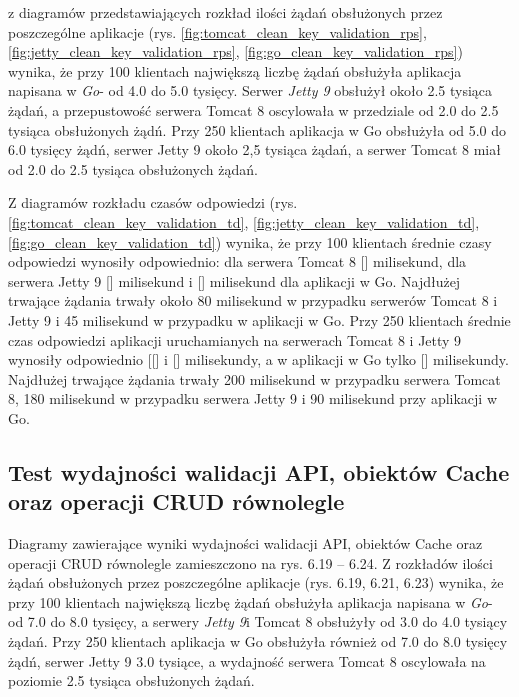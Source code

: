  z diagramów przedstawiających rozkład ilości żądań obsłużonych przez poszczególne aplikacje  (rys. \ref{fig:tomcat_clean_key_validation_rps}, \ref{fig:jetty_clean_key_validation_rps}, \ref{fig:go_clean_key_validation_rps}) wynika, że przy 100 klientach największą liczbę żądań  obsłużyła aplikacja napisana w \textsl{Go}- od 4.0 do 5.0 tysięcy. Serwer \textsl{Jetty 9} obsłużył około 2.5 tysiąca żądań, a przepustowość serwera Tomcat 8 oscylowała w przedziale od 2.0 do 2.5 tysiąca obsłużonych żądń. Przy 250 klientach aplikacja w Go obsłużyła od 5.0 do 6.0 tysięcy żądń, serwer Jetty 9 około 2,5 tysiąca żądań, a serwer Tomcat 8 miał od 2.0 do 2.5 tysiąca obsłużonych żądań. 
 
Z diagramów rozkładu czasów odpowiedzi (rys. \ref{fig:tomcat_clean_key_validation_td}, \ref{fig:jetty_clean_key_validation_td}, \ref{fig:go_clean_key_validation_td}) wynika, że przy 100 klientach średnie czasy odpowiedzi wynosiły odpowiednio: dla serwera Tomcat 8 [] milisekund, dla serwera Jetty 9 [] milisekund i [] milisekund dla aplikacji w Go.  Najdłużej trwające żądania trwały około 80 milisekund w przypadku serwerów Tomcat 8 i Jetty 9 i 45 milisekund w przypadku w aplikacji w Go. Przy 250 klientach średnie czas odpowiedzi aplikacji uruchamianych na serwerach Tomcat 8 i Jetty 9  wynosiły  odpowiednio [[] i [] milisekundy, a w aplikacji w Go tylko [] milisekundy. Najdłużej trwające żądania trwały 200 milisekund w przypadku serwera Tomcat 8, 180 milisekund w przypadku serwera Jetty 9 i 90 milisekund przy aplikacji w Go. 


\clearpage

\subsection{Test wydajności walidacji API, obiektów Cache oraz operacji CRUD równolegle}
Diagramy zawierające wyniki wydajności walidacji API, obiektów Cache oraz operacji CRUD równolegle zamieszczono na rys. 6.19 – 6.24.                                                                                            
Z rozkładów ilości żądań obsłużonych  przez poszczególne aplikacje (rys. 6.19, 6.21, 6.23) wynika, że przy 100 klientach największą liczbę żądań  obsłużyła aplikacja napisana w \textsl{Go}- od 7.0 do 8.0 tysięcy, a serwery \textsl{Jetty 9}i Tomcat 8 obsłużyły od 3.0 do 4.0  tysiący żądań. Przy 250 klientach aplikacja w Go obsłużyła również od 7.0 do 8.0 tysięcy żądń, serwer Jetty 9 3.0 tysiące, a wydajność serwera Tomcat 8 oscylowała na poziomie 2.5 tysiąca obsłużonych żądań. 
 
